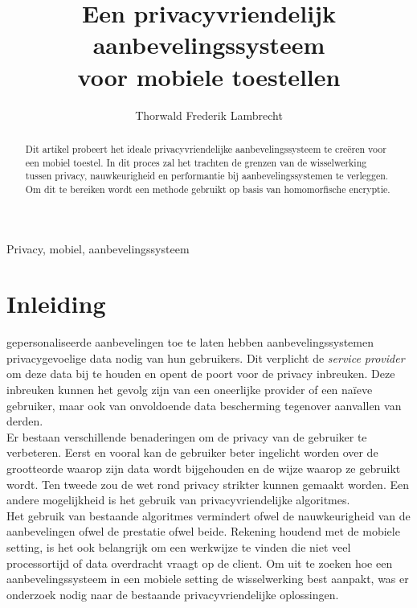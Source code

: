 \documentclass[twocolumn]{phdsymp} %
\begin{document}
\title{Een privacyvriendelijk aanbevelingssysteem\\ voor mobiele toestellen} %

\author{Thorwald Frederik Lambrecht}


\maketitle

\begin{abstract}
Dit artikel probeert het ideale privacyvriendelijke aanbevelingssysteem te cre\"eren voor een mobiel toestel. In dit proces zal het trachten de grenzen van de wisselwerking tussen privacy, nauwkeurigheid en performantie bij aanbevelingssystemen te verleggen. Om dit te bereiken wordt een methode gebruikt op basis van homomorfische encryptie.
\end{abstract}

\begin{keywords}
Privacy, mobiel, aanbevelingssysteem
\end{keywords}

\section{Inleiding}
 gepersonaliseerde aanbevelingen toe te laten hebben aanbevelingssystemen privacygevoelige data nodig van hun gebruikers. Dit verplicht de \emph{service provider} om deze data bij te houden en 
opent de poort voor de privacy inbreuken. Deze inbreuken kunnen het gevolg zijn van een oneerlijke provider of een na\"ieve gebruiker, maar ook van onvoldoende data bescherming tegenover aanvallen van derden.\\ Er bestaan verschillende benaderingen om de privacy van de gebruiker te verbeteren. Eerst en vooral kan de gebruiker beter ingelicht worden over de grootteorde waarop zijn data wordt bijgehouden en de wijze waarop ze gebruikt wordt. Ten tweede zou de wet rond privacy strikter kunnen gemaakt worden. Een andere mogelijkheid is het gebruik van privacyvriendelijke algoritmes.\\
Het gebruik van bestaande algoritmes vermindert ofwel de nauwkeurigheid van de aanbevelingen ofwel de prestatie ofwel beide. Rekening houdend met de mobiele setting, is het ook belangrijk om een werkwijze te vinden die niet veel processortijd of data overdracht vraagt op de client. Om uit te zoeken hoe een aanbevelingssysteem in een mobiele setting de wisselwerking best aanpakt, was er onderzoek nodig naar de bestaande privacyvriendelijke oplossingen.
\end{document}
